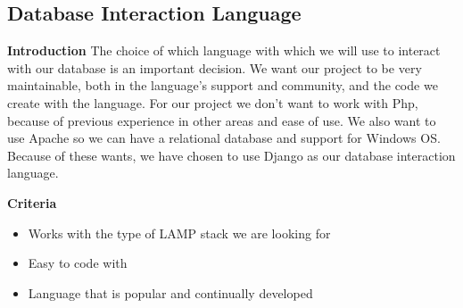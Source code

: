 \documentclass[draftclsnofoot,onecolumn,letterpaper,10pt]{IEEEtran}
\begin{document}
	\subsection{Database Interaction Language}
		\textbf{Introduction}
			The choice of which language with which we will use to interact with our database is an important decision.
			We want our project to be very maintainable, both in the language's support and community, and the code we create with the language.
			For our project we don’t want to work with Php, because of previous experience in other areas and ease of use.
			We also want to use Apache so we can have a relational database and support for Windows OS.
			Because of these wants, we have chosen to use Django as our database interaction language.

		\textbf{Criteria}
		\begin{itemize}
			\item Works with the type of LAMP stack we are looking for
			\item Easy to code with
			\item Language that is popular and continually developed
		\end{itemize}
\end{document}
